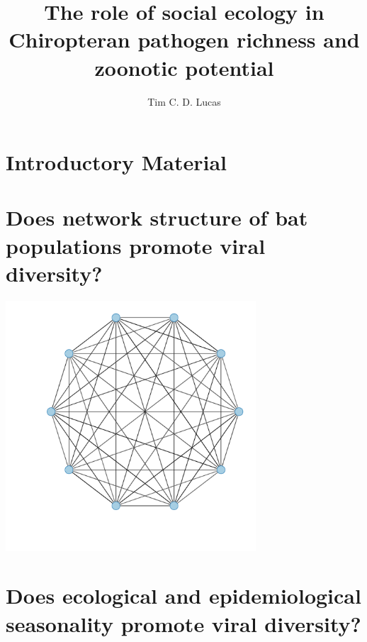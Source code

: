 \documentclass[11pt,phd,a4paper,twoside]{pretty_thesis}
\title{The role of social ecology in Chiropteran pathogen richness and zoonotic potential}
\author{Tim C. D. Lucas}
\begin{document}





\chapter{Introductory Material}
\label{chapterlabel1}


\chapter[Network structure and diversity]{Does network structure of bat populations promote viral diversity?}
\label{chapterlabel2}
\begin{center}
\includegraphics[width=0.7\textwidth]{imgs/fullyConnected.pdf}
\end{center}



\chapter[Seasonality and diversity]{Does ecological and epidemiological seasonality promote viral diversity?}
\label{chapterlabel3}

\end{document}
